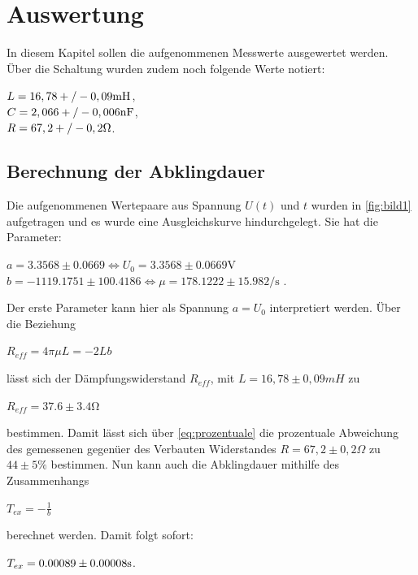 \section{Auswertung}
In diesem Kapitel sollen die aufgenommenen Messwerte ausgewertet werden.
Über die Schaltung wurden zudem noch folgende Werte notiert:
\begin{center}
    $L = 16,78 +/- 0,09 \si[]{mH}$,\\
    $C = 2,066 +/- 0,006 \si[]{nF}$,\\
    $R = 67,2 +/- 0,2 \si[]{\Omega}$.\\
\end{center}
\subsection{Berechnung der Abklingdauer}

\label{sec:abklingdauer}
Die aufgenommenen Wertepaare aus Spannung $U(t)$ und $t$ wurden in \autoref{fig:bild1}
aufgetragen und es wurde eine Ausgleichskurve hindurchgelegt. Sie hat die Parameter:
\begin{center}
    
        $a = 3.3568 \pm 0.0669 \Leftrightarrow U_0 = 3.3568 \pm 0.0669 \si{\volt}$ \\
        $b = -1119.1751 \pm 100.4186 \Leftrightarrow \mu = 178.1222 \pm 15.982 \si{\per\second}$ .\\
    
\end{center}  
Der erste Parameter kann hier als Spannung $a=U_0$ interpretiert werden.
Über die Beziehung 
\begin{center}
    $R_{eff} = 4\pi\mu L = -2 L b$
\end{center}


lässt sich der Dämpfungswiderstand $R_{eff}$, mit $L = 16,78 \pm 0,09 \si{mH}$ zu
\begin{center}
    $R_{eff} = 37.6 \pm 3.4 \si{\ohm}$
\end{center}
bestimmen. Damit lässt sich über \autoref{eq:prozentuale} die prozentuale Abweichung des gemessenen
gegenüer des Verbauten Widerstandes $R = 67,2 \pm 0,2  \si{\Omega}$ zu $44\pm 5 \si{\percent}$ bestimmen.
Nun kann auch die Abklingdauer mithilfe des Zusammenhangs
\begin{center}
    $T_{ex} = - \frac{1}{b}$
\end{center}
berechnet werden. Damit folgt sofort:
\begin{center}
    $T_{ex} = 0.00089\pm 0.00008 \si[]{s}$. \\
\end{center}

